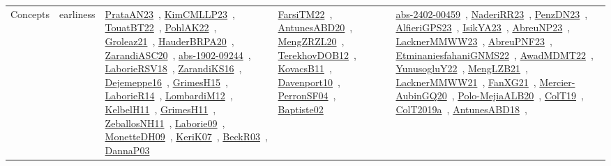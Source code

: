 {\begin{longtable}{lp{3cm}>{\raggedright\arraybackslash}p{6cm}>{\raggedright\arraybackslash}p{6cm}>{\raggedright\arraybackslash}p{8cm}}
\index{earliness}\index{Concepts!earliness}Concepts & earliness & \href{../works/PrataAN23.pdf}{PrataAN23}~\cite{PrataAN23}, \href{../works/KimCMLLP23.pdf}{KimCMLLP23}~\cite{KimCMLLP23}, \href{../works/TouatBT22.pdf}{TouatBT22}~\cite{TouatBT22}, \href{../works/PohlAK22.pdf}{PohlAK22}~\cite{PohlAK22}, \href{../works/Groleaz21.pdf}{Groleaz21}~\cite{Groleaz21}, \href{../works/HauderBRPA20.pdf}{HauderBRPA20}~\cite{HauderBRPA20}, \href{../works/ZarandiASC20.pdf}{ZarandiASC20}~\cite{ZarandiASC20}, \href{../works/abs-1902-09244.pdf}{abs-1902-09244}~\cite{abs-1902-09244}, \href{../works/LaborieRSV18.pdf}{LaborieRSV18}~\cite{LaborieRSV18}, \href{../works/ZarandiKS16.pdf}{ZarandiKS16}~\cite{ZarandiKS16}, \href{../works/Dejemeppe16.pdf}{Dejemeppe16}~\cite{Dejemeppe16}, \href{../works/GrimesH15.pdf}{GrimesH15}~\cite{GrimesH15}, \href{../works/LaborieR14.pdf}{LaborieR14}~\cite{LaborieR14}, \href{../works/LombardiM12.pdf}{LombardiM12}~\cite{LombardiM12}, \href{../works/KelbelH11.pdf}{KelbelH11}~\cite{KelbelH11}, \href{../works/GrimesH11.pdf}{GrimesH11}~\cite{GrimesH11}, \href{../works/ZeballosNH11.pdf}{ZeballosNH11}~\cite{ZeballosNH11}, \href{../works/Laborie09.pdf}{Laborie09}~\cite{Laborie09}, \href{../works/MonetteDH09.pdf}{MonetteDH09}~\cite{MonetteDH09}, \href{../works/KeriK07.pdf}{KeriK07}~\cite{KeriK07}, \href{../works/BeckR03.pdf}{BeckR03}~\cite{BeckR03}, \href{../works/DannaP03.pdf}{DannaP03}~\cite{DannaP03} & \href{../works/FarsiTM22.pdf}{FarsiTM22}~\cite{FarsiTM22}, \href{../works/AntunesABD20.pdf}{AntunesABD20}~\cite{AntunesABD20}, \href{../works/MengZRZL20.pdf}{MengZRZL20}~\cite{MengZRZL20}, \href{../works/TerekhovDOB12.pdf}{TerekhovDOB12}~\cite{TerekhovDOB12}, \href{../works/KovacsB11.pdf}{KovacsB11}~\cite{KovacsB11}, \href{../works/Davenport10.pdf}{Davenport10}~\cite{Davenport10}, \href{../works/PerronSF04.pdf}{PerronSF04}~\cite{PerronSF04}, \href{../works/Baptiste02.pdf}{Baptiste02}~\cite{Baptiste02} & \href{../works/abs-2402-00459.pdf}{abs-2402-00459}~\cite{abs-2402-00459}, \href{../works/NaderiRR23.pdf}{NaderiRR23}~\cite{NaderiRR23}, \href{../works/PenzDN23.pdf}{PenzDN23}~\cite{PenzDN23}, \href{../works/AlfieriGPS23.pdf}{AlfieriGPS23}~\cite{AlfieriGPS23}, \href{../works/IsikYA23.pdf}{IsikYA23}~\cite{IsikYA23}, \href{../works/AbreuNP23.pdf}{AbreuNP23}~\cite{AbreuNP23}, \href{../works/LacknerMMWW23.pdf}{LacknerMMWW23}~\cite{LacknerMMWW23}, \href{../works/AbreuPNF23.pdf}{AbreuPNF23}~\cite{AbreuPNF23}, \href{../works/EtminaniesfahaniGNMS22.pdf}{EtminaniesfahaniGNMS22}~\cite{EtminaniesfahaniGNMS22}, \href{../works/AwadMDMT22.pdf}{AwadMDMT22}~\cite{AwadMDMT22}, \href{../works/YunusogluY22.pdf}{YunusogluY22}~\cite{YunusogluY22}, \href{../works/MengLZB21.pdf}{MengLZB21}~\cite{MengLZB21}, \href{../works/LacknerMMWW21.pdf}{LacknerMMWW21}~\cite{LacknerMMWW21}, \href{../works/FanXG21.pdf}{FanXG21}~\cite{FanXG21}, \href{../works/Mercier-AubinGQ20.pdf}{Mercier-AubinGQ20}~\cite{Mercier-AubinGQ20}, \href{../works/Polo-MejiaALB20.pdf}{Polo-MejiaALB20}~\cite{Polo-MejiaALB20}, \href{../works/ColT19.pdf}{ColT19}~\cite{ColT19}, \href{../works/ColT2019a.pdf}{ColT2019a}~\cite{ColT2019a}, \href{../works/AntunesABD18.pdf}{AntunesABD18}~\cite{AntunesABD18}, 
\end{longtable}}
